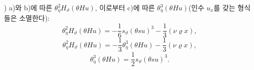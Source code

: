 
) a)와 b)에 따른 $\theta_\eta^2H_\vartheta(\theta Hu)$, 이로부터 c)에 따른 $\theta_\eta^3(\theta Hu)$(인수 $u_x$를 갖는 형식들은 소멸한다):
\[
\theta_\eta^2H_\vartheta(\theta Hu)=-\frac16s_\vartheta(\theta su)^3-\frac13(\nu\varrho x),
\]
\[
\theta_\eta^2H_\vartheta(\theta Hu)=-\frac13\theta_\eta^3(\theta Hu)-\frac13(\nu\varrho x),
\]
\[
\theta_\eta^3(\theta Hu)=\frac12s_\vartheta(\theta su)^3.
\]
